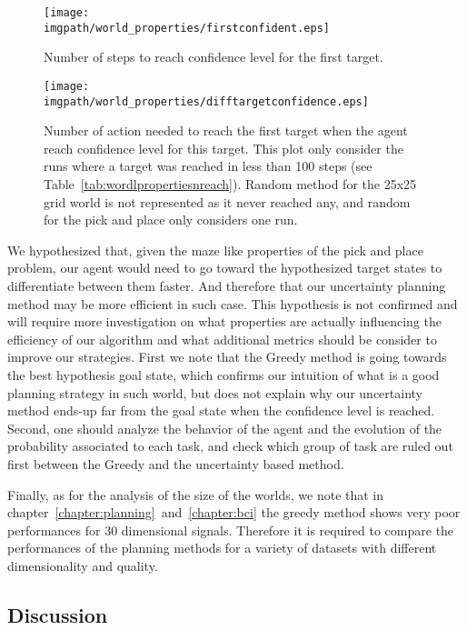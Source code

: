 \begin{figure}[!ht]
\centering
\texttt{[image: \\imgpath/world\_properties/firstconfident.eps]}
\caption{Number of steps to reach confidence level for the first target.}
\label{fig:wordlpropertiesconfidencefirst}
\end{figure} 



\begin{figure}[!ht]
\centering
\texttt{[image: \\imgpath/world\_properties/difftargetconfidence.eps]}
\caption{Number of action needed to reach the first target when the agent reach confidence level for this target. This plot only consider the runs where a target was reached in less than 100 steps (see Table~\ref{tab:wordlpropertiesnreach}). Random method for the 25x25 grid world is not represented as it never reached any, and random for the pick and place only considers one run.}
\label{fig:wordlpropertiestargetdist}
\end{figure} 

We hypothesized that, given the maze like properties of the pick and place problem, our agent would need to go toward the hypothesized target states to differentiate between them faster. And therefore that our uncertainty planning method may be more efficient in such case. This hypothesis is not confirmed and will require more investigation on what properties are actually influencing the efficiency of our algorithm and what additional metrics should be consider to improve our strategies. First we note that the Greedy method is going towards the best hypothesis goal state, which confirms our intuition of what is a good planning strategy in such world, but does not explain why our uncertainty method ends-up far from the goal state when the confidence level is reached. Second, one should analyze the behavior of the agent and the evolution of the probability associated to each task, and check which group of task are ruled out first between the Greedy and the uncertainty based method. 

Finally, as for the analysis of the size of the worlds, we note that in chapter~\ref{chapter:planning}~and~\ref{chapter:bci} the greedy method shows very poor performances for 30 dimensional signals. Therefore it is required to compare the performances of the planning methods for a variety of datasets with different dimensionality and quality.

\subsection{Discussion}

